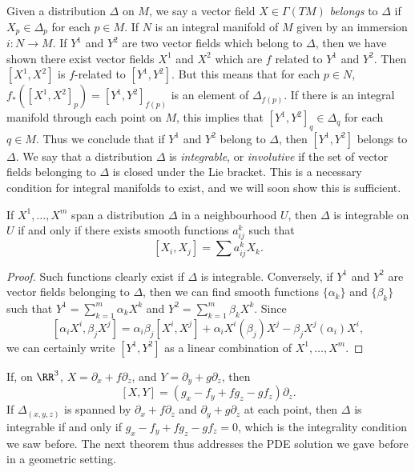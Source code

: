 Given a distribution $\Delta$ on $M$, we say a vector field $X \in \Gamma(TM)$ \emph{belongs} to $\Delta$ if $X_p \in \Delta_p$ for each $p \in M$. If $N$ is an integral manifold of $M$ given by an immersion $i: N \to M$. If $Y^1$ and $Y^2$ are two vector fields which belong to $\Delta$, then we have shown there exist vector fields $X^1$ and $X^2$ which are $f$ related to $Y^1$ and $Y^2$. Then $[X^1,X^2]$ is $f$-related to $[Y^1,Y^2]$. But this means that for each $p \in N$, $f_*([X^1,X^2]_p) = [Y^1,Y^2]_{f(p)}$ is an element of $\Delta_{f(p)}$. If there is an integral manifold through each point on $M$, this implies that $[Y^1,Y^2]_q \in \Delta_q$ for each $q \in M$. Thus we conclude that if $Y^1$ and $Y^2$ belong to $\Delta$, then $[Y^1,Y^2]$ belongs to $\Delta$. We say that a distribution $\Delta$ is \emph{integrable}, or \emph{involutive} if the set of vector fields belonging to $\Delta$ is closed under the Lie bracket. This is a necessary condition for integral manifolds to exist, and we will soon show this is sufficient.

\begin{lemma}
    If $X^1, \dots, X^m$ span a distribution $\Delta$ in a neighbourhood $U$, then $\Delta$ is integrable on $U$ if and only if there exists smooth functions $a_{ij}^k$ such that
    \[ [X_i,X_j] = \sum a_{ij}^k X_k. \]
\end{lemma}
\begin{proof}
    Such functions clearly exist if $\Delta$ is integrable. Conversely, if $Y^1$ and $Y^2$ are vector fields belonging to $\Delta$, then we can find smooth functions $\{ \alpha_k \}$ and $\{ \beta_k \}$ such that $Y^1 = \sum_{k = 1}^m \alpha_k X^k$ and $Y^2 = \sum_{k = 1}^m \beta_k X^k$. Since
    \[ [\alpha_i X^i, \beta_j X^j] = \alpha_i \beta_j [X^i,X^j] + \alpha_i X^i(\beta_j) X^j - \beta_j X^j(\alpha_i) X^i, \]
    we can certainly write $[Y^1,Y^2]$ as a linear combination of $X^1, \dots, X^m$.
\end{proof}

\begin{remark}
    If, on $\RR^3$, $X = \partial_x + f \partial_z$, and $Y = \partial_y + g \partial_z$, then
    \[ [X,Y] = \left( g_x - f_y + fg_z - g f_z \right) \partial_z. \]
    If $\Delta_{(x,y,z)}$ is spanned by $\partial_x + f \partial_z$ and $\partial_y + g \partial_z$ at each point, then $\Delta$ is integrable if and only if $g_x - f_y + fg_z - gf_z = 0$, which is the integrality condition we saw before. The next theorem thus addresses the PDE solution we gave before in a geometric setting.
\end{remark}

